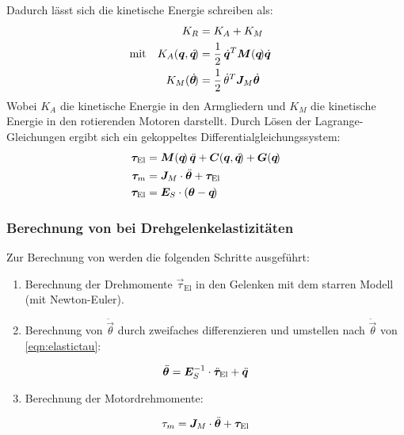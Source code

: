 				Dadurch lässt sich die kinetische Energie schreiben als:
				\begin{align*}
					           &  & K_R                           & = K_A + K_M                                                       &  \\
					\text{mit} &  & K_A(\bm{q}, \dot{\bm{q}}\!) & = \frac{1}{2} \, \dot{\bm{q}}^T \bm{M}(\bm{q}\!) \dot{\bm{q}} &  \\
					           &  & K_M(\dot{\bm{\theta}}\!)     & = \frac{1}{2} \, \dot{\theta}^T \bm{J}_M \dot{\bm{\theta}}      &
				\end{align*}
				Wobei \( K_A \) die kinetische Energie in den Armgliedern und \( K_M \) die kinetische Energie in den rotierenden Motoren darstellt. Durch Lösen der Lagrange-Gleichungen ergibt sich ein gekoppeltes Differentialgleichungssystem:
				\begin{align*}
					\bm{\tau}_\text{El} & = \bm{M}(\bm{q}\!) \, \ddot{\bm{q}} + \bm{C}(\bm{q}, \dot{\bm{q}}\!) + \bm{G}(\bm{q}\!) \\
					\bm{\tau}_m         & = \bm{J}_M \cdot \ddot{\bm{\theta}} + \bm{\tau}_\text{El}                                 \\
					\bm{\tau}_\text{El} & = \bm{E}_S \cdot (\bm{\theta} - \bm{q}\!)  \label{eqn:elastictau}
				\end{align*}

			\subsubsection{Berechnung von \INVDYN bei Drehgelenkelastizitäten}
				Zur Berechnung von \INVDYN werden die folgenden Schritte ausgeführt:
				\begin{enumerate}
					\item Berechnung der Drehmomente \( \vec{\tau}_\text{El} \) in den Gelenken mit dem starren Modell (\zB mit Newton-Euler).
					\item Berechnung von \( \ddot{\vec{\theta}} \) durch zweifaches differenzieren und umstellen nach \( \ddot{\vec{\theta}} \) von \ref{eqn:elastictau}:
				\end{enumerate}
				\begin{equation*}
					\ddot{\bm{\theta}} = \bm{E}_S^{-1} \cdot \ddot{\bm{\tau}}_\text{El} + \ddot{\bm{q}}
				\end{equation*}
				\begin{enumerate}
					\setcounter{enumi}{2}
					\item Berechnung der Motordrehmomente:
				\end{enumerate}
				\begin{equation*}
					\tau_m = \bm{J}_M \cdot \ddot{\bm{\theta}} + \bm{\tau}_\text{El}
				\end{equation*}

